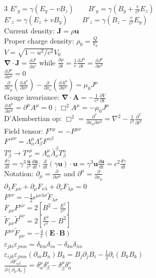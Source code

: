 \documentclass[a4paper,twoside]{article}
\begin{document}
\begin{multicols*}{3}
\(E'_y = \gamma (E_y - v B_z) \qquad B'_y = \gamma (B_y + \frac{v}{c^2} E_z) \)\\
\(E'_z = \gamma (E_z + v B_y) \qquad B'_z = \gamma (B_z - \frac{v}{c^2} E_y) \)\\
Current density: \(\bm J = \rho \bm u\)\\
Proper charge density: \(\rho_0 = \frac{Q}{V_0}\)\\
\(V = \sqrt{1 - u^2/c^2}V_0\)\\
\( \bm \nabla \cdot \bm J = \frac{\partial J^{i}}{\partial x^i} \) while \(\frac{\partial \rho}{\partial t} = \frac{1}{c} \frac{\partial J^0}{\partial t } = \frac{\partial J^0}{\partial x^0}\)\\
\(\frac{\partial J^\mu}{\partial x^\mu} = 0\)\\
\(\frac{\partial}{\partial x_\mu }(\frac{\partial A^\nu}{\partial x^\nu})-\frac{\partial}{\partial x_\nu }(\frac{\partial A^\mu}{\partial x^\nu}) = \mu_0 J^\mu\)\\
Gauge invariance: \(\bm \nabla \cdot \bm A = -\frac{1}{c^2} \frac{\partial V}{\partial t}\)\\
\(\frac{\partial A^\mu}{\partial x^\mu} = \partial^\mu A^\mu = 0\) ; \(\Box^2 A^\mu = - \mu_0 J^\mu\)\\
D'Alembertian op: \(\Box^2 = \frac{\partial^2}{\partial x_\mu \partial x^\mu} = \nabla^2 -\frac{1}{c^2} \frac{\partial^2}{\partial t^2} \)    \\
Field tensor: \(F^{\nu\mu} = - F^{\mu\nu}\)\\
\(F'^{\mu\nu} = \Lambda^\mu_\alpha \Lambda^\nu_\beta F^{\alpha\beta}\)\\
\(T^\alpha_\beta \to T'^\mu_\nu = \Lambda^\mu_\alpha \bar{\Lambda}_\nu^\beta T^{\alpha}_{\beta}\)\\
\(\frac{d \gamma}{d t} =\gamma^3 \frac{\bm u}{c^2} \frac{d \bm u}{dt}\); \( \frac{d}{dt} (\gamma \bm u) \cdot \bm u = \gamma^3 \bm u \frac{d \bm u}{dt} = c^2 \frac{d\gamma}{dt} \)\\
Notation: \(\partial_\mu = \frac{\partial}{\partial x^\mu}\) and \(\partial^\mu = \frac{\partial}{\partial x_\mu}\)\\
\(\partial_\lambda F_{\mu\nu} + \partial_\mu F_{\nu\lambda} + \partial_\nu F_{\lambda\mu} = 0 \)\\
\(F^{\mu\nu} = - \frac{1}{2} \epsilon^{\mu\nu\lambda\sigma} \tilde{F}_{\lambda\sigma} \)     \\
\(F_{\mu \nu} F^{\mu \nu} = 2[ B^2 - \frac{E^2}{c^2} ]\)\\
\(\tilde{F}_{\mu \nu} \tilde{F}^{\mu \nu}  = 2[ \frac{E^2}{c^2} - B^2]\)\\
\(F^{\mu \nu } \tilde{F}_{\mu \nu} = -\frac{4}{c}(\bm E \cdot \bm B)\)\\
\(\varepsilon_{jki}\varepsilon_{jmn} = \delta_{km}\delta_{in} - \delta_{kn}\delta_{im}\)\\
\(\varepsilon_{ijk}\varepsilon_{jmn}(\partial_m B_n)B_k = B_j\partial_j B_i - \tfrac{1}{2}\partial_i(B_k B_k)\)\\
\(\frac{\partial F_{\alpha\beta}}{\partial(\partial_\mu A_\nu)} = \delta^\mu_\alpha \delta^\nu_\beta - \delta^\mu_\beta \delta^\nu_\alpha\)


\end{multicols*}
\end{document}
